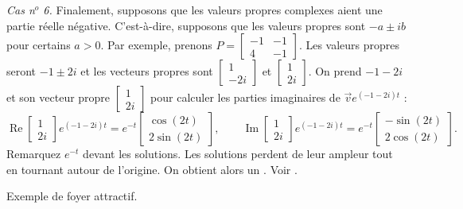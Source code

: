 \medskip

\emph{Cas n$^o$ 6.} Finalement, supposons que les valeurs propres complexes aient une partie réelle négative. C’est-à-dire, supposons que les valeurs propres sont $-a \pm ib$ pour certains $a > 0$.
Par exemple, prenons $P = 
\left[ \begin{smallmatrix} -1 & -1 \\ 4 & -1 \end{smallmatrix} \right]$.
Les valeurs propres seront $-1\pm 2i$ et les vecteurs propres sont
$\left[ \begin{smallmatrix} 1 \\ -2i \end{smallmatrix} \right]$ et
$\left[ \begin{smallmatrix} 1 \\ 2i \end{smallmatrix} \right]$.  On prend
$-1 - 2i$ et son vecteur propre
$\left[ \begin{smallmatrix} 1 \\ 2i \end{smallmatrix} \right]$ pour calculer les parties imaginaires de
$\vec{v} e^{(-1-2i)t}$ :
\begin{equation*}
\operatorname{Re}
\begin{bmatrix} 1 \\ 2i \end{bmatrix} e^{(-1-2i)t} =
e^{-t}
\begin{bmatrix} \cos (2t) \\ 2 \sin (2t)  \end{bmatrix} ,
\qquad
\operatorname{Im}
\begin{bmatrix} 1 \\ 2i \end{bmatrix} e^{(-1-2i)t} =
e^{-t}
\begin{bmatrix} -\sin (2t) \\ 2 \cos (2t) \end{bmatrix} .
\end{equation*}
Remarquez $e^{-t}$ devant les solutions. Les solutions perdent de leur ampleur tout en tournant autour de l'origine. On obtient alors un \emph{}. Voir .

\begin{myfig}
\capstart
{}
\caption{Exemple de foyer attractif.\label{pln:spiral-sinkfig}}
\end{myfig}

